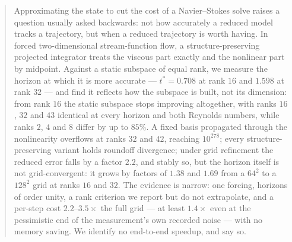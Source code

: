 \begin{abstract}
Approximating the state to cut the cost of a Navier--Stokes solve raises a
question usually asked backwards: not how accurately a reduced model tracks a
trajectory, but when a reduced trajectory is worth having. In forced
two-dimensional stream-function flow, a structure-preserving projected integrator
treats the viscous part exactly and the nonlinear part by midpoint.
Against a static subspace of equal rank, we measure the horizon at which it
is more accurate --- $t^\ast = 0.708$ at rank $16$ and
$1.598$ at rank $32$ --- and find it reflects how the subspace is built,
not its dimension: from rank $16$ the static subspace stops improving altogether, with
ranks $16$, $32$ and $43$ identical at every horizon and both Reynolds
numbers, while ranks $2$, $4$ and $8$ differ by up to $85\%$. A fixed basis propagated
through the nonlinearity overflows at ranks $32$ and $42$, reaching $10^{278}$; every structure-preserving variant holds roundoff divergence; under grid
refinement the reduced error falls by a factor $2.2$, and stably so, but the
horizon itself is not grid-convergent: it grows by factors of $1.38$ and $1.69$ from a $64^2$ to a $128^2$ grid at ranks $16$ and $32$. The evidence is narrow: one
forcing, horizons of order unity, a rank criterion we report but do not
extrapolate, and a per-step cost $2.2$--$3.5\times$ the full grid --- at least
$1.4\times$ even at the pessimistic end of the measurement's own recorded noise
--- with no memory saving. We identify no end-to-end speedup, and say so.
\end{abstract}
